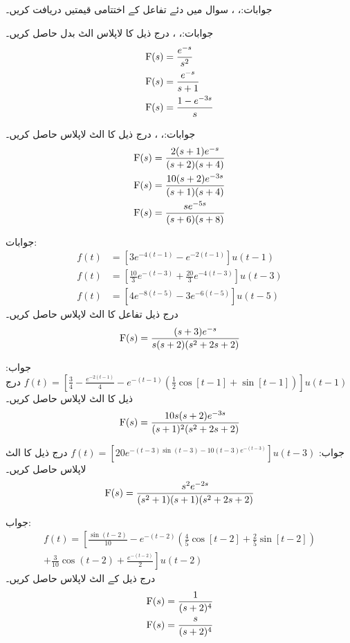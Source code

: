 جوابات:، ، 
سوال  میں دئے تفاعل کے اختتامی قیمتیں دریافت کریں۔

جوابات:، ، 
درج ذیل کا لاپلاس الٹ بدل حاصل کریں۔
\begin{align*}
{\ensuremath{{\textup{F}}}}(s)&=\frac{e^{-s}}{s^2}\\
{{\textup{F}}}(s)&=\frac{e^{-s}}{s+1}\\
{{\textup{F}}}(s)&=\frac{1-e^{-3s}}{s}
\end{align*}

جوابات:، ، 
درج ذیل کا الٹ لاپلاس حاصل کریں۔
\begin{align*}
{\ensuremath{{\textup{F}}}}(s)&=\frac{2(s+1)e^{-s}}{(s+2)(s+4)}\\
{{\textup{F}}}(s)&=\frac{10(s+2)e^{-3s}}{(s+1)(s+4)}\\
{{\textup{F}}}(s)&=\frac{se^{-5s}}{(s+6)(s+8)}
\end{align*}

جوابات:
\begin{align*}
f(t)&=\left[3e^{-4(t-1)}-e^{-2(t-1)}\right]u(t-1)\\
f(t)&=\left[\frac{10}{3}e^{-(t-3)}+\frac{20}{3}e^{-4(t-3)}\right]u(t-3)\\
f(t)&=\left[4e^{-8(t-5)}-3e^{-6(t-5)}\right]u(t-5)
\end{align*}
درج ذیل تفاعل کا الٹ لاپلاس حاصل کریں۔
\begin{align*}
{\ensuremath{{\textup{F}}}}(s)=\frac{(s+3)e^{-s}}{s(s+2)(s^2+2s+2)}
\end{align*}

جواب:
$f(t)=\left[\frac{3}{4}-\frac{e^{-2(t-1)}}{4}-e^{-(t-1)}\left(\frac{1}{2}\cos [t-1]+\sin [t-1]\right)\right]u(t-1)$
درج ذیل کا الٹ لاپلاس حاصل کریں۔
\begin{align*}
{\ensuremath{{\textup{F}}}}(s)=\frac{10s(s+2)e^{-3s}}{(s+1)^2(s^2+2s+2)}
\end{align*}

جواب:
$f(t)=\left[20e^{-(t-3)\sin(t-3)-10(t-3)e^{-(t-3)}}\right]u(t-3)$
درج ذیل کا الٹ لاپلاس حاصل کریں۔
\begin{align*}
{\ensuremath{{\textup{F}}}}(s)=\frac{s^2e^{-2s}}{(s^2+1)(s+1)(s^2+2s+2)}
\end{align*}

جواب:
\begin{multline*}
f(t)=\left[\frac{\sin (t-2)}{10}-e^{-(t-2)} \left(\frac{4}{5}\cos [t-2]+\frac{2}{5}\sin [t-2]\right) \right.\\
\left.+\frac{3}{10}\cos (t-2)+\frac{e^{-(t-2)}}{2}\right]u(t-2)
\end{multline*}
درج ذیل کے الٹ لاپلاس حاصل کریں۔
\begin{align*}
{\ensuremath{{\textup{F}}}}(s)&=\frac{1}{(s+2)^4}\\
{{\textup{F}}}(s)&=\frac{s}{(s+2)^4}
\end{align*}

